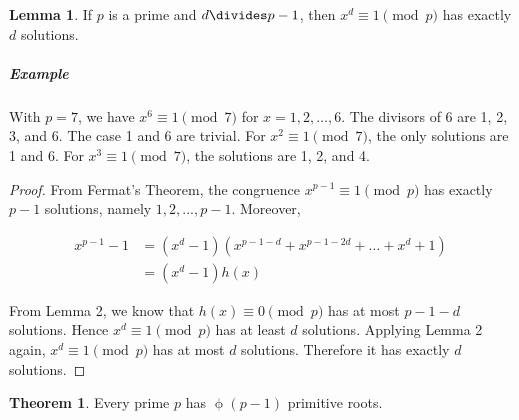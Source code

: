 \documentclass{article}
\theoremstyle{definition} %
\newtheorem{theorem}{Theorem}[section] %
\theoremstyle{definition}
\theoremstyle{definition}
\newtheorem{lemma}{Lemma}[section]
\newcommand{\tot}{\upphi}
\theoremstyle{definition}
\begin{document}
  \begin{lemma}
    If $p$ is a prime and $d \divides p - 1$, then $x^d \equiv 1 \pmod{p}$ has exactly $d$ solutions.
  \end{lemma}
  
  \subparagraph{Example} With $p = 7$, we have $x^6 \equiv 1 \pmod{7}$ for
    $x = 1, 2, \dots, 6$. The divisors of 6 are 1, 2, 3, and 6. The case 1 and 6 are
    trivial. For $x^2 \equiv 1 \pmod{7}$, the only solutions are 1 and 6. For
    $x^3 \equiv 1 \pmod{7}$, the solutions are 1, 2, and 4.
  
  \begin{proof}
    From Fermat's Theorem, the congruence $x^{p - 1} \equiv 1 \pmod{p}$ has exactly
    $p - 1$ solutions, namely $1, 2, ..., p - 1$. Moreover,
    
    \begin{align*}
      x^{p - 1} - 1 &= (x^d - 1)(x^{p-1-d}+x^{p-1-2d}+\dots + x^d+1) \\
        &= (x^d - 1)h(x)
    \end{align*}
    
    From Lemma 2, we know that $h(x) \equiv 0 \pmod{p}$ has at most $p - 1 - d$
    solutions. Hence $x^d \equiv 1 \pmod{p}$ has at least $d$ solutions.
    Applying Lemma 2 again, $x^d \equiv 1 \pmod{p}$ has at most $d$ solutions.
    Therefore it has exactly $d$ solutions.
  \end{proof}
  
  \begin{theorem}
    Every prime $p$ has $\tot(p - 1)$ primitive roots.
  \end{theorem}
  
\end{document}

